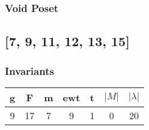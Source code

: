 \documentclass[a4paper]{article}
\begin{document}
\hfill\begin{minipage}{0.48\textwidth}
\subsubsection*{Void Poset}
\centering
{}
\end{minipage}
\newpage\subsection{[7, 9, 11, 12, 13, 15]}
\noindent\begin{minipage}{0.6\textwidth}
\subsubsection*{Invariants}
\centering
\begin{tabular}{|c|c|c|c|c|c|c|}
\toprule
g & F & m & ewt & t & \(|M|\) & \(|\lambda|\) \\
\midrule
9 & 17 & 7 & 9 & 1 & 0 & 20 \\
\bottomrule
\end{tabular}
\end{minipage}%
\end{document}
